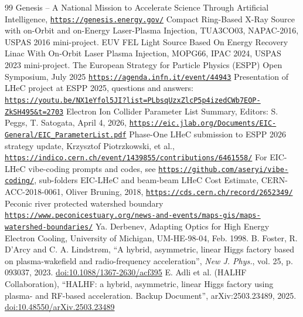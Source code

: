 \documentclass[%
               refpage       %
               hyphens,      %
               ]{jacow}
\begin{document}
\begin{thebibliography}{99}
Genesis -- A National Mission to Accelerate Science Through Artificial Intelligence, \href{https://genesis.energy.gov/}{\nolinkurl{https://genesis.energy.gov/}}
Compact Ring-Based X-Ray Source with on-Orbit and on-Energy Laser-Plasma Injection, TUA3CO03, NAPAC-2016, 
USPAS 2016 mini-project.
EUV FEL Light Source Based On Energy Recovery Linac With On-Orbit Laser Plasma Injection, MOPG66, IPAC 2024, 
USPAS 2023 mini-project.
The European Strategy for Particle Physics (ESPP) Open Symposium, July 2025 \href{https://agenda.infn.it/event/44943/}{\nolinkurl{https://agenda.infn.it/event/44943}}
Presentation of LHeC project at ESPP 2025, questions and answers: 
\href{https://youtu.be/NX1eYfol5JI?list=PLbsqUzxZlcP5p4izedCWb7EOP-ZkSH495&t=2703}{\nolinkurl{https://youtu.be/NX1eYfol5JI?list=PLbsqUzxZlcP5p4izedCWb7EOP-ZkSH495&t=2703}}
Electron Ion Collider Parameter List
Summary, 
Editors: S. Peggs, T. Satogata, April 4, 2026,  
\href{https://eic.jlab.org/Documents/EIC-General/EIC_ParameterList.pdf}{\nolinkurl{https://eic.jlab.org/Documents/EIC-General/EIC_ParameterList.pdf}}
Phase-One LHeC submission to ESPP 2026 strategy update, Krzysztof Piotrzkowski, et al., 
\href{https://indico.cern.ch/event/1439855/contributions/6461558/}{\nolinkurl{https://indico.cern.ch/event/1439855/contributions/6461558/}}
For EIC-LHeC vibe-coding prompts and codes, see \href{https://github.com/aseryi/vibe-coding/}{\nolinkurl{https://github.com/aseryi/vibe-coding/}}, sub-folders EIC-LHeC and beam-beam
LHeC Cost Estimate, CERN-ACC-2018-0061, Oliver Bruning, 2018, \href{https://cds.cern.ch/record/2652349/}{\nolinkurl{https://cds.cern.ch/record/2652349/}}
Peconic river protected watershed boundary
\href{https://www.peconicestuary.org/news-and-events/maps-gis/maps-watershed-boundaries/}{\nolinkurl{https://www.peconicestuary.org/news-and-events/maps-gis/maps-watershed-boundaries/}}
Ya. Derbenev, Adapting Optics for High Energy Electron Cooling, University of Michigan, UM-HE-98-04, Feb. 1998.
B. Foster, R. D'Arcy and C. A. Lindstr{\o}m, “A hybrid, asymmetric, linear Higgs factory based on plasma-wakefield and radio-frequency acceleration”, \textit{New J. Phys.}, vol. 25, p.
093037, 2023. \url{doi:10.1088/1367-2630/acf395}
E. Adli et al. (HALHF Collaboration), “HALHF: a hybrid, asymmetric, linear Higgs factory using plasma- and RF-based acceleration. Backup Document”, arXiv:2503.23489, 2025. \url{doi:10.48550/arXiv.2503.23489}

\end{thebibliography}
\end{document}
